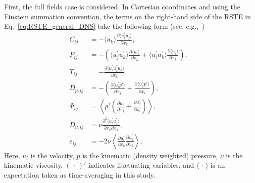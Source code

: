 First, the full fields case is considered. 
In Cartesian coordinates and using the Einstein summation convention, the terms on the right-hand side of the RSTE in Eq.~\eqref{eq:RSTE_general_DNS} take the following form (see, e.g.,~\cite{pope2000turbulent})
\begin{align}
    C_{ij} &= -\langle u_k \rangle \frac{\partial \langle u^{\prime}_i u^{\prime}_j \rangle}{\partial x_k},
    \\
    P_{ij} &= - \left( \langle u^{\prime}_j u^{\prime}_k \rangle \frac{\partial \langle u_i \rangle}{\partial x_k} + \langle u^{\prime}_i u^{\prime}_k \rangle \frac{\partial \langle u_j \rangle}{\partial x_k} \right),
    \\
    T_{ij} &= - \frac{\partial \langle u^{\prime}_i u^{\prime}_j u^{\prime}_k \rangle}{\partial x_k} ,
    \\
    D_{p,ij} &= - \left( \frac{\partial \langle u^{\prime}_i p' \rangle}{\partial x_j} + \frac{\partial \langle u^{\prime}_j p' \rangle}{\partial x_i} \right),
    \\
    \Phi_{ij} &= \left\langle p' \left( \frac{\partial u^{\prime}_i}{\partial x_j} + \frac{\partial u^{\prime}_j}{\partial x_i} \right) \right\rangle,
    \\
    D_{\nu,ij} &= \nu \frac{\partial^2 \langle u^{\prime}_i u^{\prime}_j \rangle}{\partial x_k \partial x_k},
    \\
    \varepsilon_{ij} &= -2\nu \left\langle \frac{\partial u^{\prime}_i}{\partial x_k} \frac{\partial u^{\prime}_j}{\partial x_k} \right\rangle.
\end{align}
Here, $u_i$ is the velocity, $p$ is the kinematic (density weighted) pressure, $\nu$ is the kinematic viscosity, $(\, \cdot \,)'$ indicates fluctuating variables, and $\langle \, \cdot \, \rangle$ is an expectation taken as time-averaging in this study.


